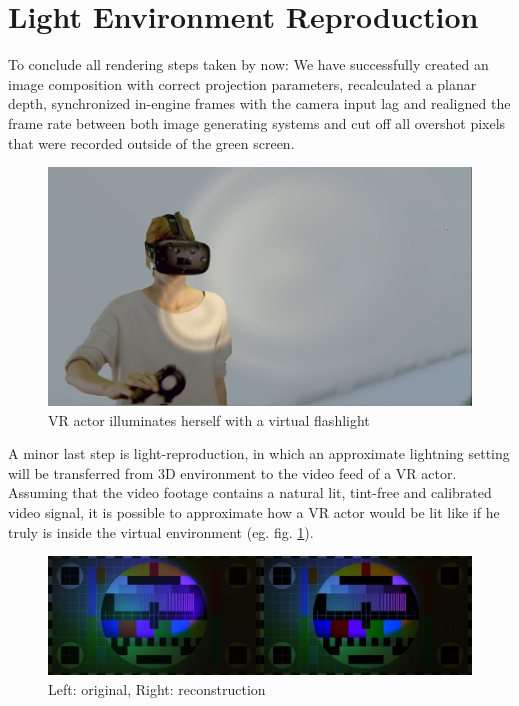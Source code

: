 %
\section{Light Environment Reproduction}

To conclude all rendering steps taken by now: We have successfully created an 
image composition with correct projection parameters, recalculated a planar 
depth, synchronized in-engine frames with the camera input lag and realigned 
the frame rate between both image generating systems and cut off all overshot 
pixels that were recorded outside of the green screen.

\begin{figure}[htbp]
	\label{fig:light-reconstruction:actor}
	\includegraphics[width=\textwidth]{gfx/recoloring/self-illu.png}
	\caption{VR actor illuminates herself with a virtual flashlight}
\end{figure}

A minor last step is light-reproduction, in which an approximate lightning 
setting will be transferred from 3D environment to the video feed of a VR 
actor. Assuming that the video footage contains a natural lit, tint-free and 
calibrated video signal, it is possible to approximate how a VR actor would 
be lit like if he truly is inside the virtual environment (eg. fig. 
\ref{fig:light-reconstruction:actor}).

\begin{figure}[htb]
	\includegraphics[width=\textwidth]{_raw_resources/light-reconstruction/comparison.jpg}
	\caption{Left: original, Right: reconstruction}
	\label{fig:light-reconstruction:diff-capture}
\end{figure}

